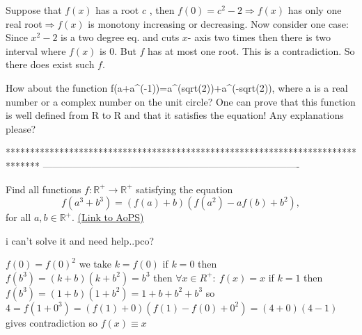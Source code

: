 \begin{solution}
	Suppose that $f(x)$ has a root $c$ , then $f(0)=c^2-2\Rightarrow f(x)$ has only one real root$\Rightarrow f(x)$ is monotony increasing or decreasing. 
Now consider one case: 
Since $x^2-2$ is a two degree eq. and cuts $x$- axis two times then there is two interval where $f(x)$ is $0$. But $f$ has at most one root. This is a contradiction. So there does exist such $f$.
\end{solution}



\begin{solution}
	How about the function f(a+a^(-1))=a^(sqrt(2))+a^(-sqrt(2)), where a is a real number or a complex number on the unit circle? One can prove that this function is well defined from R to R and that it satisfies the equation! Any explanations please?
\end{solution}
*******************************************************************************
-------------------------------------------------------------------------------

\begin{problem}
	Find all functions $ f: \mathbb{R^+} \to \mathbb{R^+}$ satisfying the equation
\[f(a^3+b^3)=(f(a)+b)(f(a^2)-af(b)+b^2),\]
for all $a,b \in \mathbb{R}^+$.
	\flushright \href{https://artofproblemsolving.com/community/c6h178896}{(Link to AoPS)}
\end{problem}



\begin{solution}
	i can't solve it and need help..pco? 
\end{solution}



\begin{solution}
	$ f(0) = f(0)^2$ we take $ k = f(0)$
if $ k = 0$ then $ f(b^3) = (k + b)(k + b^2) = b^3$
then $ \forall x\in R^ + : \ f(x) = x$
if $ k = 1$ then $ f(b^3) = (1 + b)(1 + b^2) = 1 + b + b^2 + b^3$
so $ 4=f(1+0^3)=(f(1)+0)(f(1)-f(0)+0^2)=(4+0)(4-1)$ gives contradiction
so $ f(x)\equiv x$
\end{solution}



